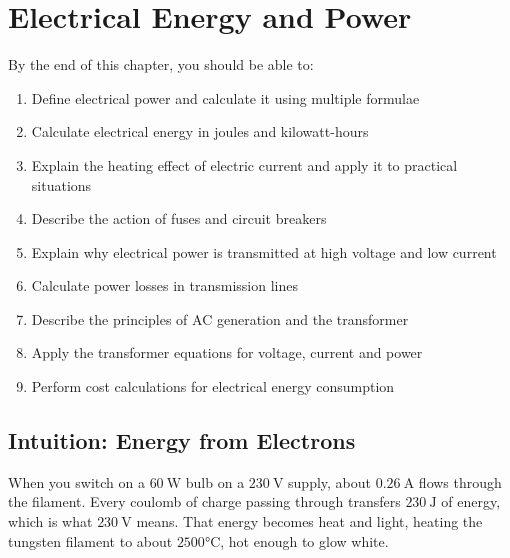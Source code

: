 %

\chapter{Electrical Energy and Power}
\label{ch:electrical_power}
\minitoc
\newpage


\begin{objectivebox}
By the end of this chapter, you should be able to:
\begin{enumerate}[noitemsep]
  \item Define electrical power and calculate it
  using multiple formulae
  \item Calculate electrical energy in joules and
  kilowatt-hours
  \item Explain the heating effect of electric
  current and apply it to practical situations
  \item Describe the action of fuses and circuit
  breakers
  \item Explain why electrical power is transmitted
  at high voltage and low current
  \item Calculate power losses in transmission lines
  \item Describe the principles of AC generation
  and the transformer
  \item Apply the transformer equations for voltage,
  current and power
  \item Perform cost calculations for electrical
  energy consumption
\end{enumerate}
\end{objectivebox}

\section{Intuition: Energy from Electrons}

When you switch on a $60\ \text{W}$ bulb on a $230\ \text{V}$ supply,
about $0.26\ \text{A}$ flows through the filament. Every coulomb of
charge passing through transfers $230\ \text{J}$ of energy, which is
what $230\ \text{V}$ means. That energy becomes heat and light,
heating the tungsten filament to about $2500°\text{C}$, hot enough to
glow white.

